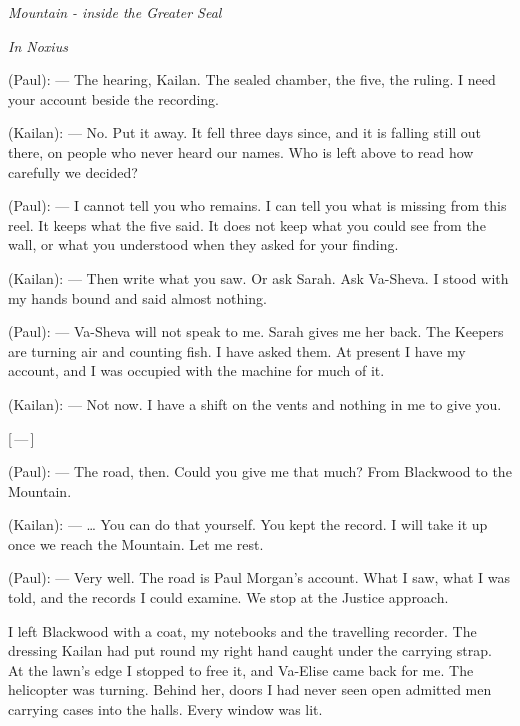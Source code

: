 
\begin{center}\small\itshape Mountain - inside the Greater Seal\end{center}

\begin{room}

\textit{In Noxius}

(Paul): --- The hearing, Kailan. The sealed chamber, the five, the ruling. I need your account beside the recording.

(Kailan): --- No. Put it away. It fell three days since, and it is falling still out there, on people who never heard our names. Who is left above to read how carefully we decided?

(Paul): --- I cannot tell you who remains. I can tell you what is missing from this reel. It keeps what the five said. It does not keep what you could see from the wall, or what you understood when they asked for your finding.

(Kailan): --- Then write what you saw. Or ask Sarah. Ask Va-Sheva. I stood with my hands bound and said almost nothing.

(Paul): --- Va-Sheva will not speak to me. Sarah gives me her back. The Keepers are turning air and counting fish. I have asked them. At present I have my account, and I was occupied with the machine for much of it.

(Kailan): --- Not now. I have a shift on the vents and nothing in me to give you.

\centerline{[\,---\,]}

(Paul): --- The road, then. Could you give me that much? From Blackwood to the Mountain.

(Kailan): --- \ldots{} You can do that yourself. You kept the record. I will take it up once we reach the Mountain. Let me rest.

(Paul): --- Very well. The road is Paul Morgan's account. What I saw, what I was told, and the records I could examine. We stop at the Justice approach.

\end{room}

I left Blackwood with a coat, my notebooks and the travelling recorder. The dressing Kailan had put round my right hand caught under the carrying strap. At the lawn's edge I stopped to free it, and Va-Elise came back for me. The helicopter was turning. Behind her, doors I had never seen open admitted men carrying cases into the halls. Every window was lit.\par

